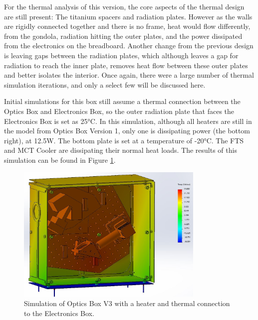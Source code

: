 For the thermal analysis of this version, the core aspects of the thermal design are still present: The titanium spacers and radiation plates. However as the walls are rigidly connected together and there is no frame, heat would flow differently, from the gondola, radiation hitting the outer plates, and the power dissipated from the electronics on the breadboard. Another change from the previous design is leaving gaps between the radiation plates, which although leaves a gap for radiation to reach the inner plate, removes heat flow between these outer plates and  better isolates the interior. Once again, there were a large number of thermal simulation iterations, and only a select few will be discussed here.

Initial simulations for this box still assume a thermal connection between the Optics Box and Electronics Box, so the outer radiation plate that faces the Electronics Box is set as 25°C. In this simulation, although all heaters are still in the model from Optics Box Version 1, only one is dissipating power (the bottom right), at 12.5W. The bottom plate is set at a temperature of -20°C. The FTS and MCT Cooler are dissipating their normal heat loads. The results of this simulation can be found in Figure \ref{fig:OB_V3_TA_1}.

\begin{figure}
    \centering
    \includegraphics[width=0.8\textwidth]{chap3_images/LIFE_V3_images/TA_-20_deg_20_deg_12W_heater.JPG}
    \caption{Simulation of Optics Box V3 with a heater and thermal connection to the Electronics Box.}
    \label{fig:OB_V3_TA_1}
\end{figure}

